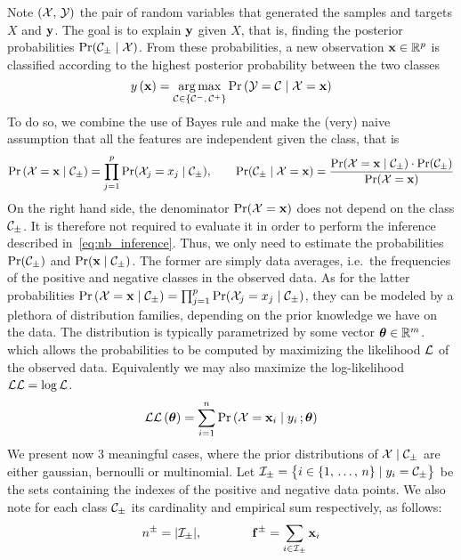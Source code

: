Note $\left( \mathcal{X},\, \mathcal{Y} \right)$ the pair of random variables that generated the samples and targets $X$ and $\mathbf{y}$.
The goal is to explain $\mathbf{y}$ given $X$, that is, finding the posterior probabilities $\Pr(\mathcal{C}_\pm \mid \mathcal{X})$.
From these probabilities, a new observation $\mathbf{x} \in \mathbb{R}^p$ is classified according to the highest
posterior probability between the two classes
\begin{equation}\label{eq:nb_inference}
y\left( \mathbf{x} \right) = \underset{\mathcal{C} \in \left\{ \mathcal{C}^-,\, \mathcal{C}^+ \right\}}{\operatorname*{arg\,max}} \Pr\left( \mathcal{Y} = \mathcal{C} \mid \mathcal{X} = \mathbf{x} \right)
\end{equation}
To do so, we combine the use of Bayes rule and make the (very) naive assumption that
all the features are independent given the class, that is
\begin{equation}
    \Pr\left( \mathcal{X} = \mathbf{x} \mid \mathcal{C}_\pm \right) = \prod_{j = 1}^p \Pr(\mathcal{X}_j = x_j \mid \mathcal{C}_\pm)
    ,\qquad
    \Pr(\mathcal{C}_\pm \mid \mathcal{X} = \mathbf{x}) = \frac{\Pr(\mathcal{X} = \mathbf{x} \mid \mathcal{C}_\pm) \cdot \Pr(\mathcal{C}_\pm)}{\Pr(\mathcal{X} = \mathbf{x})}
\end{equation}
On the right hand side,
the denominator $\Pr(\mathcal{X} = \mathbf{x})$ does not depend on the class $\mathcal{C}_\pm$.
It is therefore not required to evaluate it in order to perform the inference described in~\ref{eq:nb_inference}.
Thus, we only need to estimate the probabilities $\Pr(\mathcal{C}_\pm)$ and $\Pr(\mathbf{x} \mid \mathcal{C}_\pm)$.
The former are simply data averages, i.e.\ the frequencies of the positive and negative classes in the observed data.
As for the latter probabilities
$\Pr\left( \mathcal{X} = \mathbf{x} \mid \mathcal{C}_\pm \right) = \prod_{j = 1}^p \Pr(\mathcal{X}_j = x_j \mid \mathcal{C}_\pm)$,
they can be modeled by a plethora of distribution families, depending on the prior knowledge we have on the data.
The distribution is typically parametrized by some vector $\bm{\theta} \in \mathbb{R}^m$.
which allows the probabilities to be computed by maximizing the likelihood $\mathcal{L}$ of the observed data.
Equivalently we may also maximize the log-likelihood $\mathcal{L}\mathcal{L} = \log\mathcal{L}$.
\begin{equation*}
    \mathcal{L}\mathcal{L}\left( \bm{\theta} \right) = \sum_{i = 1}^n \Pr\left( \mathcal{X} = \mathbf{x}_i \mid y_i \,; \bm{\theta} \right)
\end{equation*}
We present now 3 meaningful cases, where the prior distributions of $\mathcal{X} \mid \mathcal{C}_\pm$ are either
gaussian, bernoulli or multinomial.
Let $\mathcal{I}_\pm = \big\{ i \in \left\{ 1,\, \dots,\, n \right\} \mid y_i = \mathcal{C}_\pm \big\}$ be the sets containing the
indexes of the positive and negative data points.
We also note for each class $\mathcal{C}_\pm$ its cardinality and empirical sum respectively, as follows:
\begin{equation*}
    n^\pm = | \mathcal{I}_\pm |,
    \qquad\qquad
    \mathbf{f}^\pm = \sum_{i \in \mathcal{I}_\pm} \mathbf{x}_i
\end{equation*}

